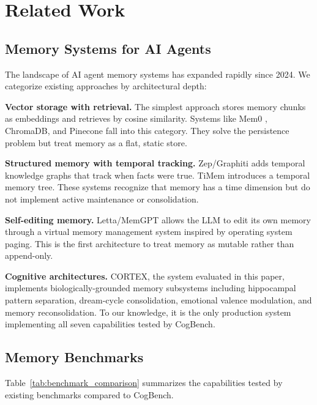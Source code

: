 \documentclass{article}
\begin{document}
\section{Related Work}
\label{sec:related}

\subsection{Memory Systems for AI Agents}

The landscape of AI agent memory systems has expanded rapidly since 2024. We categorize existing approaches by architectural depth:

\textbf{Vector storage with retrieval.} The simplest approach stores memory chunks as embeddings and retrieves by cosine similarity. Systems like Mem0 \citep{mem0}, ChromaDB, and Pinecone fall into this category. They solve the persistence problem but treat memory as a flat, static store.

\textbf{Structured memory with temporal tracking.} Zep/Graphiti \citep{zep2025} adds temporal knowledge graphs that track when facts were true. TiMem \citep{timem2025} introduces a temporal memory tree. These systems recognize that memory has a time dimension but do not implement active maintenance or consolidation.

\textbf{Self-editing memory.} Letta/MemGPT \citep{packer2023memgpt} allows the LLM to edit its own memory through a virtual memory management system inspired by operating system paging. This is the first architecture to treat memory as mutable rather than append-only.

\textbf{Cognitive architectures.} CORTEX, the system evaluated in this paper, implements biologically-grounded memory subsystems including hippocampal pattern separation, dream-cycle consolidation, emotional valence modulation, and memory reconsolidation. To our knowledge, it is the only production system implementing all seven capabilities tested by CogBench.

\subsection{Memory Benchmarks}

Table~\ref{tab:benchmark_comparison} summarizes the capabilities tested by existing benchmarks compared to CogBench.
\end{document}
